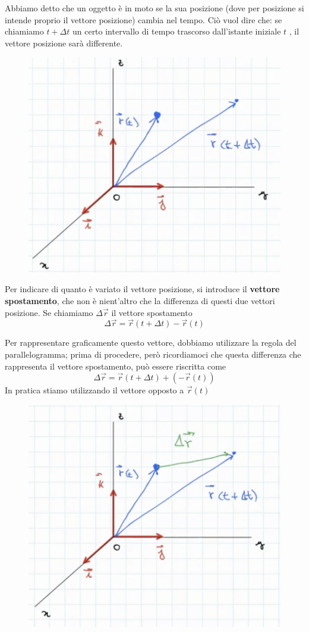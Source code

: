Abbiamo detto che un oggetto è in moto se la sua posizione (dove per posizione si intende proprio il vettore posizione) cambia nel tempo. Ciò vuol dire che: se chiamiamo $ t + \Delta t $ un certo intervallo di tempo trascorso dall'istante iniziale $ t $ , il vettore posizione sarà differente.

\begin{figure}[h]
\begin{center}
\includegraphics[width = 0.5 \textwidth]{lezione2/images/sistema riferimento4}
\label{fig:riferimento4}
\end{center}
\end{figure}

Per indicare di quanto è variato il vettore posizione, si introduce il \textbf{vettore spostamento}, che non è nient'altro che la differenza di questi due vettori posizione. Se chiamiamo $ \Delta \overrightarrow{r} $ il vettore spostamento
$$ \Delta \overrightarrow{r} = \overrightarrow{r} ( t + \Delta t) - \overrightarrow{r} ( t ) $$

Per rappresentare graficamente questo vettore, dobbiamo utilizzare la regola del parallelogramma; prima di procedere, però ricordiamoci che questa differenza che rappresenta il vettore spostamento, può essere riscritta come
$$ \Delta \overrightarrow{r} = \overrightarrow{r} ( t + \Delta t) + ( - \overrightarrow{r} ( t ) ) $$
\newpage
In pratica stiamo utilizzando il vettore opposto a $ \overrightarrow{r} (t) $

\begin{figure}[h]
\begin{center}
\includegraphics[width = 0.5 \textwidth]{lezione2/images/sistema riferimento5}
\label{fig:riferimento5}
\end{center}
\end{figure}

